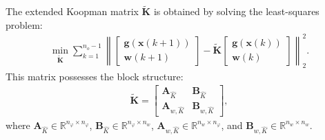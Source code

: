 The extended Koopman matrix $\tilde{\bm{K}}$ is obtained by solving the least-squares problem:
\begin{align}
    \min_{\tilde{\bm{K}}} \sum_{k=1}^{n_o-1} 
    \left\|  
    \begin{bmatrix} 
        \bm{g}(\bm{x}(k+1)) \\[1mm] 
        \bm{w}(k+1) 
    \end{bmatrix}   
    - \tilde{\bm{K}} 
    \begin{bmatrix} 
        \bm{g}(\bm{x}(k)) \\[1mm]
        \bm{w}(k) 
    \end{bmatrix} \right\|_2^2.
    \label{eq:ExtendedKoopmanMinimizationProblem}
\end{align}
This matrix possesses the block structure:
\begin{align}
    \tilde{\bm{K}} = \begin{bmatrix} 
        \bm{A}_{\hat{K}} & \bm{B}_{\hat{K}} \\ 
        \bm{A}_{w,\hat{K}} & \bm{B}_{w,\hat{K}} 
    \end{bmatrix},
\end{align}
where 
$\bm{A}_{\hat{K}} \in \mathbb{R}^{n_\varphi \times n_\varphi}$, 
$\bm{B}_{\hat{K}} \in \mathbb{R}^{n_\varphi \times n_w}$, 
$\bm{A}_{w,\hat{K}} \in \mathbb{R}^{n_w \times n_\varphi}$, 
and $\bm{B}_{w,\hat{K}} \in \mathbb{R}^{n_w \times n_w}$.


